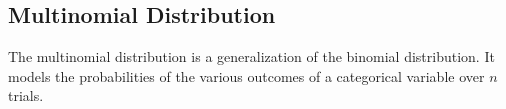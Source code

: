 \documentclass[8pt, a4paper, landscape, includeheadfoot]{extarticle}
\begin{document}
\begin{multicols*}{4}
	\section{Multinomial Distribution}
	The multinomial distribution is a generalization of the binomial distribution. It models the probabilities of the various outcomes of a categorical variable over $n$ trials.





\end{multicols*}
\end{document}
